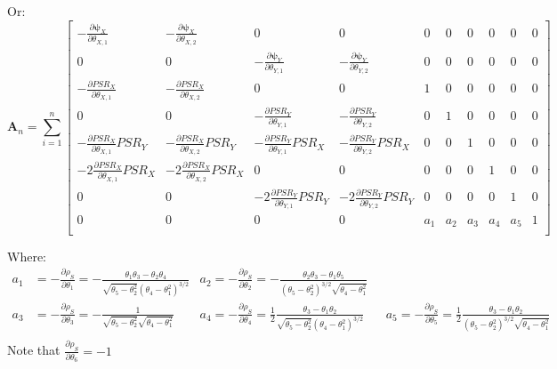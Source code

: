 \documentclass[]{article}
\begin{document}
Or:
\[
\pmb{A}_n =  \sum_{i = 1}^{n} \begin{bmatrix}
   -\frac{\partial \pmb{\psi}_X}{\partial \theta_{X, 1}}    &  -\frac{\partial \pmb{\psi}_X}{\partial \theta_{X, 2}}    &   0   &   0   &     0     &     0    &    0    &    0    &    0    &   0 \\
    0   &   0   &   -\frac{\partial \pmb{\psi}_Y}{\partial \theta_{Y, 1}} &   -\frac{\partial \pmb{\psi}_Y}{\partial \theta_{Y,2}}      &     0     &     0    &    0    &    0    &    0    &   0  \\
    -\frac{\partial PSR_X}{\partial \theta_{X,1}}   &  -\frac{\partial PSR_X}{\partial \theta_{X,2}}   & 0   &   0   &   1   &   0  & 0 & 0 & 0 & 0\\
    0 & 0 &    -\frac{\partial PSR_Y}{\partial \theta_{Y,1}}   &  -\frac{\partial PSR_Y}{\partial \theta_{Y,2}}   & 0 & 1 & 0 & 0 & 0 & 0 \\
     -\frac{\partial PSR_X}{\partial \theta_{X,1}} PSR_Y  &  -\frac{\partial PSR_X}{\partial \theta_{X,2}}PSR_Y & -\frac{\partial PSR_Y}{\partial \theta_{Y,1}} PSR_X  &  -\frac{\partial PSR_Y}{\partial \theta_{Y,2}}PSR_X & 0 & 0 &  1 & 0 & 0 & 0 \\
    -2\frac{\partial PSR_X}{\partial \theta_{X,1}} PSR_X  &  -2\frac{\partial PSR_X}{\partial \theta_{X,2}}PSR_X & 0 & 0 & 0 & 0 &  0 & 1 & 0 & 0 \\
    0 & 0 & -2\frac{\partial PSR_Y}{\partial \theta_{Y,1}}PSR_Y  &  -2\frac{\partial PSR_Y}{\partial \theta_{Y,2}}PSR_Y & 0 & 0 &  0 & 0 & 1 & 0 \\
    0 & 0 & 0 & 0 & a_1 & a_2 &  a_3 & a_4 & a_5 & 1 \\
\end{bmatrix}
\]

Where:
  $$
  \begin{aligned}
    a_1 &= -\frac{\partial \rho_S}{\partial \theta_1} = -\frac{\theta_1\theta_3 - \theta_2\theta_4}{\sqrt{\theta_5 - \theta_2^2}(\theta_4 - \theta_1^2)^{3/2}}
    &a_2 = -\frac{\partial \rho_S}{\partial \theta_2} = -\frac{\theta_2\theta_3 - \theta_1\theta_5}{(\theta_5 - \theta_2^2)^{3/2} \sqrt{\theta_4 - \theta_1^2}}\\
    a_3 &= -\frac{\partial \rho_S}{\partial \theta_3} = -\frac{1}{\sqrt{\theta_5 - \theta_2^2}\sqrt{\theta_4 - \theta_1^2}}
    &a_4 = -\frac{\partial \rho_S}{\partial \theta_4} = \frac{1}{2}\frac{\theta_3 - \theta_1\theta_2}{\sqrt{\theta_5 - \theta_2^2}(\theta_4 - \theta_1^2)^{3/2}}
    &~~~a_5 = -\frac{\partial \rho_S}{\partial \theta_5} = \frac{1}{2}\frac{\theta_3 - \theta_1\theta_2}{(\theta_5 - \theta_2^2)^{3/2} \sqrt{\theta_4 - \theta_1^2}}\\
   \end{aligned}
  $$
Note that $\frac{\partial \rho_S}{\partial \theta_6} = -1$
\end{document}
